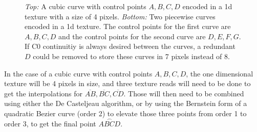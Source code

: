 \documentclass{jcgt}
\begin{document}
  \begin{figure}

    \vspace{5mm}

    \caption{\textit{Top:} A cubic curve with control points $A,B,C,D$ encoded in a 1d texture with a size of 4 pixels.  \textit{Bottom:} Two piecewise curves encoded in a 1d texture.  The control points for the first curve are $A,B,C,D$ and the control points for the second curve are $D,E,F,G$.  If C0 continuitiy is always desired between the curves, a redundant $D$ could be removed to store these curves in 7 pixels instead of 8. }    
    \label{fig:texlayeout1d}
  \end{figure}

In the case of a cubic curve with control points $A,B,C,D$, the one dimensional texture will be 4 pixels in size, and three texture reads will need to be done to get the interpolations for $\overline{AB},\overline{BC},\overline{CD}$.  Those will then need to be combined using either the De Casteljeau algorithm, or by using the Bernstein form of a quadratic Bezier curve (order 2) to elevate those three points from order 1 to order 3, to get the final point $\stackrel{\frown}{ABCD}$.
\end{document}
